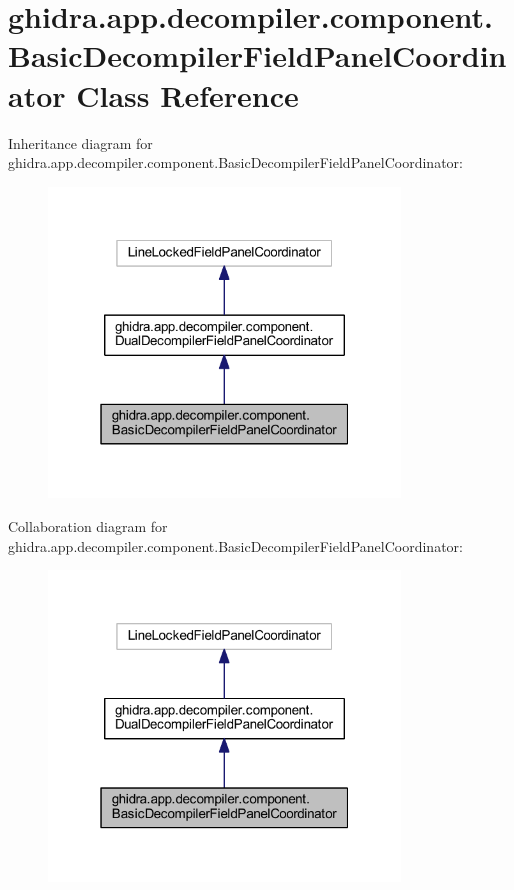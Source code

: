 \hypertarget{classghidra_1_1app_1_1decompiler_1_1component_1_1_basic_decompiler_field_panel_coordinator}{}\section{ghidra.\+app.\+decompiler.\+component.\+Basic\+Decompiler\+Field\+Panel\+Coordinator Class Reference}
\label{classghidra_1_1app_1_1decompiler_1_1component_1_1_basic_decompiler_field_panel_coordinator}


Inheritance diagram for ghidra.\+app.\+decompiler.\+component.\+Basic\+Decompiler\+Field\+Panel\+Coordinator\+:
\nopagebreak
\begin{figure}[H]
\begin{center}
\leavevmode
\includegraphics[width=265pt]{classghidra_1_1app_1_1decompiler_1_1component_1_1_basic_decompiler_field_panel_coordinator__inherit__graph}
\end{center}
\end{figure}


Collaboration diagram for ghidra.\+app.\+decompiler.\+component.\+Basic\+Decompiler\+Field\+Panel\+Coordinator\+:
\nopagebreak
\begin{figure}[H]
\begin{center}
\leavevmode
\includegraphics[width=265pt]{classghidra_1_1app_1_1decompiler_1_1component_1_1_basic_decompiler_field_panel_coordinator__coll__graph}
\end{center}
\end{figure}
